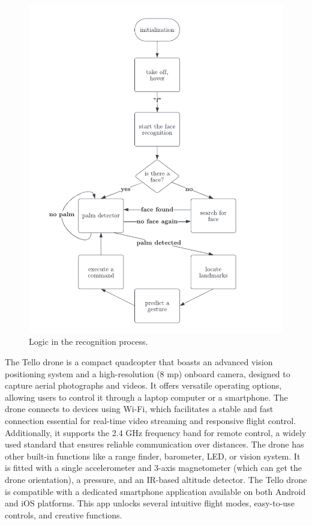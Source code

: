 \begin{figure}
	\centering
	\includegraphics[width =1.1 \textwidth]{images/flowchart.pdf}
	\caption{Logic in the recognition process.}
	\label{fig:flowchart}
\end{figure}

The Tello drone is a compact quadcopter that boasts an advanced vision positioning system and a high-resolution (8 mp) onboard camera, designed to capture aerial photographs and videos. It offers versatile operating options, allowing users to control it through a laptop computer or a smartphone. The drone connects to devices using Wi-Fi, which facilitates a stable and fast connection essential for real-time video streaming and responsive flight control. Additionally, it supports the 2.4 GHz frequency band for remote control, a widely used standard that ensures reliable communication over distances. The drone has other built-in functions like a range finder, barometer, LED, or vision system. It is fitted with a single accelerometer and 3-axis magnetometer (which can get the drone orientation), a pressure, and an IR-based altitude detector. The Tello drone is compatible with a dedicated smartphone application available on both Android and iOS platforms. This app unlocks several intuitive flight modes, easy-to-use controls, and creative functions.

